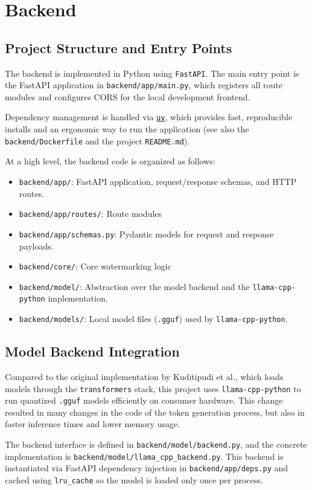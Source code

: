 \section{Backend}
\subsection{Project Structure and Entry Points}
The backend is implemented in Python using \texttt{FastAPI}. The main entry point is the FastAPI application in
\texttt{backend/app/main.py}, which registers all route modules and configures CORS for the local development
frontend.

Dependency management is handled via \href{https://docs.astral.sh/uv/}{\texttt{uv}}, which provides fast, reproducible
installs and an ergonomic way to run the application (see also the \texttt{backend/Dockerfile} and the project
\texttt{README.md}).

At a high level, the backend code is organized as follows:
\begin{itemize}
    \item \texttt{backend/app/}: FastAPI application, request/response schemas, and HTTP routes.
    \item \texttt{backend/app/routes/}: Route modules
    \item \texttt{backend/app/schemas.py}: Pydantic models for request and response payloads.
    \item \texttt{backend/core/}: Core watermarking logic
    \item \texttt{backend/model/}: Abstraction over the model backend and the \texttt{llama-cpp-python} implementation.
    \item \texttt{backend/models/}: Local model files (\texttt{.gguf}) used by \texttt{llama-cpp-python}.
\end{itemize}


\subsection{Model Backend Integration}
Compared to the original implementation by Kuditipudi et al.\cite{kuditipudi2023robustarticle}, which loads models through the
\texttt{transformers} stack, this project uses \texttt{llama-cpp-python} to run quantized \texttt{.gguf} models
efficiently on consumer hardware. This change resulted in many changes in the code of the token generation process, but also in faster inference times and lower memory usage.

The backend interface is defined in \texttt{backend/model/backend.py}, and the concrete
implementation is \texttt{backend/model/llama\_cpp\_backend.py}. This backend is instantiated via FastAPI dependency
injection in \texttt{backend/app/deps.py} and cached using \texttt{lru\_cache} so the model is loaded only once per
process.

